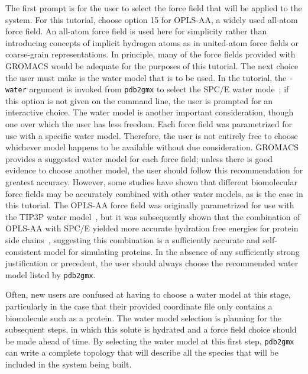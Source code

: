 \documentclass[9pt,tutorial,pubversion]{livecoms}
\begin{document}
The first prompt is for the user to select the force field that will be applied to the system. For this tutorial, choose option 15 for OPLS-AA, a widely used all-atom force field. An all-atom force field is used here for simplicity rather than introducing concepts of implicit hydrogen atoms as in united-atom force fields or coarse-grain representations. In principle, many of the force fields provided with GROMACS would be adequate for the purposes of this tutorial. The next choice the user must make is the water model that is to be used. In the tutorial, the \texttt{-water} argument is invoked from \texttt{pdb2gmx} to select the SPC/E water mode~\cite{Berendsen1987}; if this option is not given on the command line, the user is prompted for an interactive choice. The water model is another important consideration, though one over which the user has less freedom. Each force field was parametrized for use with a specific water model. Therefore, the user is not entirely free to choose whichever model happens to be available without due consideration. GROMACS provides a suggested water model for each force field; unless there is good evidence to choose another model, the user should follow this recommendation for greatest accuracy. However, some studies have shown that different biomolecular force fields may be accurately combined with other water models, as is the case in this tutorial. The OPLS-AA force field was originally parametrized for use with the TIP3P water model~\cite{Jorgensen1983}, but it was subsequently shown that the combination of OPLS-AA with SPC/E yielded more accurate hydration free energies for protein side chains~\cite{Hess2006}, suggesting this combination is a sufficiently accurate and self-consistent model for simulating proteins. In the absence of any sufficiently strong justification or precedent, the user should always choose the recommended water model listed by \texttt{pdb2gmx}.

Often, new users are confused at having to choose a water model at this stage, particularly in the case that their provided coordinate file only contains a biomolecule such as a protein. The water model selection is planning for the subsequent steps, in which this solute is hydrated and a force field choice should be made ahead of time. By selecting the water model at this first step, \texttt{pdb2gmx} can write a complete topology that will describe all the species that will be included in the system being built.
\end{document}
